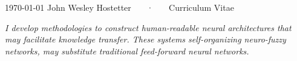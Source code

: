 \documentclass[11pt, letterpaper]{academic-cv}
\begin{document}


\vspace{
-5cm
}
\makecvheader

\makecvfooter
  {\monthyeardate\today}
  {John Wesley Hostetter ~~~·~~~ Curriculum Vitae}
  {\thepage}

\textit{I develop methodologies to construct human-readable neural architectures that may facilitate knowledge transfer. These systems \textemdash self-organizing neuro-fuzzy networks, may substitute traditional feed-forward neural networks.}

\vspace{-10pt}








% 
%


\end{document}
